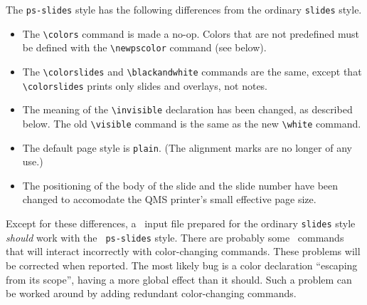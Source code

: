 The {\tt ps-slides} style has the following differences from the
ordinary {\tt slides} style.
\begin{itemize}
\item The \verb+\colors+
 command is made a no-op. Colors that are not predefined
    must be defined with the \verb+\newpscolor+ command (see below).
 
\item The \verb+\colorslides+ and \verb+\blackandwhite+ commands are
the same, except that
\verb+\colorslides+ prints only slides and overlays, not notes.
 
\item The meaning of the \verb+\invisible+ declaration has been
changed, as described below.  The old \verb+\visible+ command is the
same as the new \verb+\white+ command.
 
\item The default page style is {\tt plain}.  (The alignment marks are
no longer of any use.)

\item The positioning of the body of the slide and the slide number have
   been changed to accomodate the QMS printer's small effective page 
   size.
\end{itemize}
Except for these differences, a \SLiTeX\ input file prepared for the
ordinary {\tt slides} style {\em should\/} work with the {\tt
ps-slides} style.  There are probably some \SLiTeX\ commands that will
interact incorrectly with color-changing commands.  These problems will
be corrected when reported.  The most likely bug is a color declaration
``escaping from its scope'', having a more global effect than it should.
Such a problem can be worked around by adding redundant color-changing
commands.

